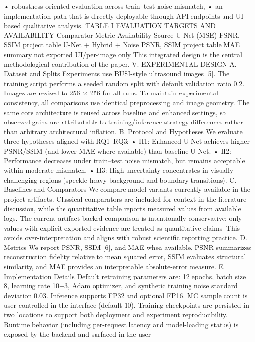 • robustness-oriented evaluation across train–test noise mismatch,
• an implementation path that is directly deployable
through API endpoints and UI-based qualitative analysis.
TABLE I
EVALUATION TARGETS AND AVAILABILITY
Comparator Metric Availability Source
U-Net (MSE) PSNR, SSIM project table
U-Net + Hybrid + Noise PSNR, SSIM project table
MAE summary not exported UI/per-image only
This integrated design is the central methodological contribution of the paper.
V. EXPERIMENTAL DESIGN
A. Dataset and Splits
Experiments use BUSI-style ultrasound images [5]. The
training script performs a seeded random split with default
validation ratio 0.2. Images are resized to 256 × 256 for all
runs.
To maintain experimental consistency, all comparisons use
identical preprocessing and image geometry. The same core
architecture is reused across baseline and enhanced settings,
so observed gains are attributable to training/inference strategy
differences rather than arbitrary architectural inflation.
B. Protocol and Hypotheses
We evaluate three hypotheses aligned with RQ1–RQ3:
• H1: Enhanced U-Net achieves higher PSNR/SSIM (and
lower MAE where available) than baseline U-Net.
• H2: Performance decreases under train–test noise mismatch, but remains acceptable within moderate mismatch.
• H3: High uncertainty concentrates in visually challenging
regions (speckle-heavy background and boundary transitions).
C. Baselines and Comparators
We compare model variants currently available in the project
artifacts. Classical comparators are included for context in
the literature discussion, while the quantitative table reports
measured values from available logs.
The current artifact-backed comparison is intentionally conservative: only values with explicit exported evidence are
treated as quantitative claims. This avoids over-interpretation
and aligns with robust scientific reporting practice.
D. Metrics
We report PSNR, SSIM [6], and MAE when available.
PSNR summarizes reconstruction fidelity relative to mean
squared error, SSIM evaluates structural similarity, and MAE
provides an interpretable absolute-error measure.
E. Implementation Details
Default retraining parameters are: 12 epochs, batch size 8,
learning rate 10−3, Adam optimizer, and synthetic training
noise standard deviation 0.03. Inference supports FP32 and
optional FP16. MC sample count is user-controlled in the
interface (default 10).
Training checkpoints are persisted in two locations to support both deployment and experiment reproducibility. Runtime
behavior (including per-request latency and model-loading
status) is exposed by the backend and surfaced in the user
